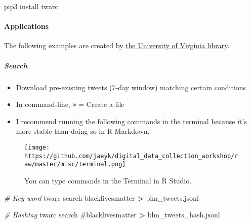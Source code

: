 \documentclass[
]{book}
\newenvironment{Shaded}{\begin{snugshade}}{\end{snugshade}}
\newcommand{\CommentTok}[1]{\textcolor[rgb]{0.56,0.35,0.01}{\textit{#1}}}
\newcommand{\ExtensionTok}[1]{#1}
\newcommand{\NormalTok}[1]{#1}
\newcommand{\OperatorTok}[1]{\textcolor[rgb]{0.81,0.36,0.00}{\textbf{#1}}}
\newcommand{\StringTok}[1]{\textcolor[rgb]{0.31,0.60,0.02}{#1}}
\begin{document}
\begin{Shaded}
\begin{Highlighting}[]
\ExtensionTok{pip3}\NormalTok{ install twarc}
\end{Highlighting}
\end{Shaded}

\hypertarget{applications}{%
\paragraph{Applications}\label{applications}}

The following examples are created by \href{http://digitalcollecting.lib.virginia.edu/toolkit/docs/social-media/twarc-commands/}{the University of Virginia library}.

\hypertarget{search}{%
\subparagraph{Search}\label{search}}

\begin{itemize}
\item
  Download pre-existing tweets (7-day window) matching certain conditions
\item
  In command-line, \texttt{\textgreater{}} = Create a file
\item
  I recommend running the following commands in the terminal because it's more stable than doing so in R Markdown.
\end{itemize}

\begin{figure}
\centering
\texttt{[image: https://github.com/jaeyk/digital\_data\_collection\_workshop/raw/master/misc/terminal.png]}
\caption{You can type commands in the Terminal in R Studio.}
\end{figure}

\begin{Shaded}
\begin{Highlighting}[]
\CommentTok{\# Key word }
\ExtensionTok{twarc}\NormalTok{ search blacklivesmatter }\OperatorTok{\textgreater{}}\NormalTok{ blm\_tweets.jsonl}
\end{Highlighting}
\end{Shaded}

\begin{Shaded}
\begin{Highlighting}[]
\CommentTok{\# Hashtag }
\ExtensionTok{twarc}\NormalTok{ search }\StringTok{\textquotesingle{}\#blacklivesmatter\textquotesingle{}} \OperatorTok{\textgreater{}}\NormalTok{ blm\_tweets\_hash.jsonl}
\end{Highlighting}
\end{Shaded}
\end{document}
